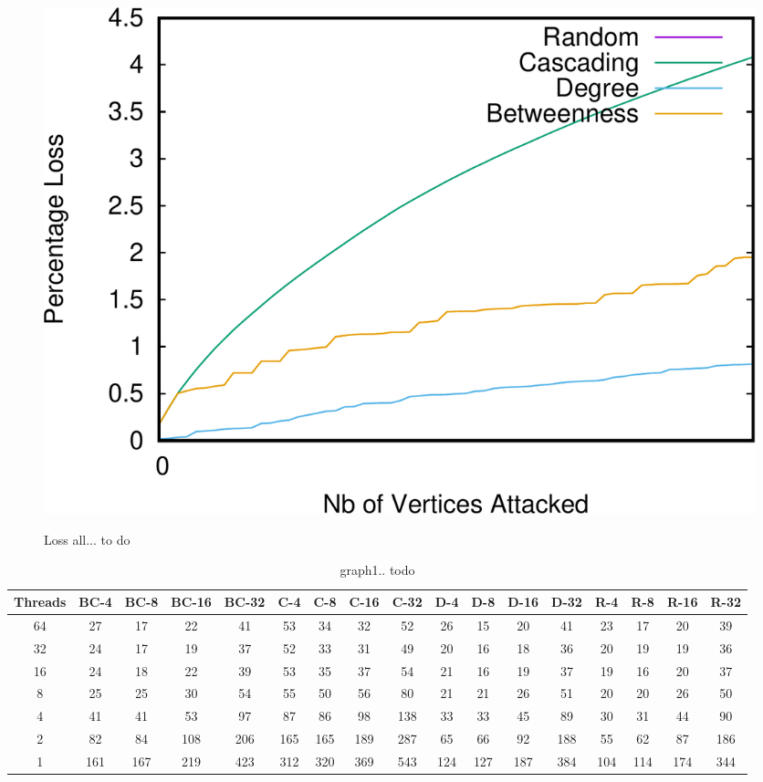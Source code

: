 \begin{figure}
\centering
\includegraphics[scale=0.3]{bench/loss-all-crop.pdf}
\label{fig:loss-100}
\caption{Loss all... to do}
\end{figure}
\onecolumngrid
\begin{table}
{\scriptsize
\begin{tabular}{||c||c|c|c|c||c|c|c|c||c|c|c|c||c|c|c|c|}
\hline
\textbf{Threads}	&\cellcolor{black!10}BC-4&	\cellcolor{black!10}BC-8	&\cellcolor{black!10}BC-16	&\cellcolor{black!10}BC-32&	\cellcolor{black!10}C-4	&\cellcolor{black!10}C-8&	\cellcolor{black!10}C-16&	\cellcolor{black!10}C-32&	\cellcolor{black!10}D-4&	\cellcolor{black!10}D-8	&\cellcolor{black!10}D-16&\cellcolor{black!10}	D-32&	\cellcolor{black!10}R-4	&\cellcolor{black!10}R-8&	\cellcolor{black!10}R-16&	\cellcolor{black!10}R-32 \\ \hline \hline
64&		27	&17	&22	&41	&53	&34	&32	&52	&26	&15	&20	&41	&23	&17	&20	&39			\\ \hline					
32&		24	&17	&19	&37	&52	&33	&31	&49	&20	&16	&18	&36	&20	&19	&19	&36	\\ \hline
16&		24	&18	&22	&39	&53	&35	&37	&54	&21	&16	&19	&37	&19	&16	&20&37	\\ \hline
8	&	25	&25	&30	&54	&55	&50	&56	&80	&21	&21	&26	&51	&20	&20	&26	&50	\\ \hline
4	&	41	&41	&53	&97	&87	&86	&98	&138	&33	&33	&45	&89	&30	&31	&44	&90	\\ \hline
2&		82	&84	&108	&206	&165	&165	&189	&287	&65	&66	&92	&188	&55	&62	&87	&186	\\ \hline
1&		161	&167	&219	&423	&312	&320	&369	&543	&124	&127	&187	&384	&104	&114	&174	&344	\\ \hline
\end{tabular}
}
\label{tab:graph4}
\caption{graph1.. todo}
\end{table}
\twocolumngrid



